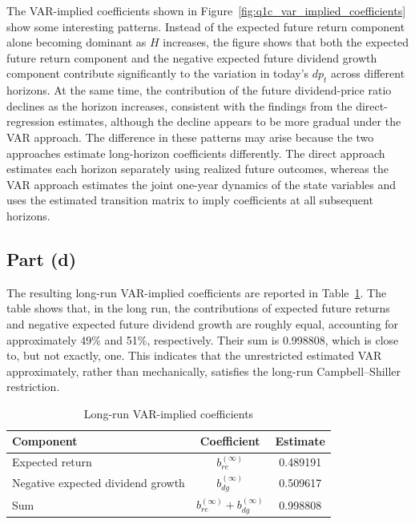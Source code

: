 \documentclass[11pt]{article}
\begin{document}
The VAR-implied coefficients shown in Figure~\ref{fig:q1c_var_implied_coefficients} show some interesting patterns. Instead of the expected future return component alone becoming dominant as $H$ increases, the figure shows that both the expected future return component and the negative expected future dividend growth component contribute significantly to the variation in today's $dp_t$ across different horizons. At the same time, the contribution of the future dividend-price ratio declines as the horizon increases, consistent with the findings from the direct-regression estimates, although the decline appears to be more gradual under the VAR approach.
The difference in these patterns may arise because the two approaches estimate long-horizon coefficients differently. The direct approach estimates each horizon separately using realized future outcomes, whereas the VAR approach estimates the joint one-year dynamics of the state variables and uses the estimated transition matrix to imply coefficients at all subsequent horizons.

\subsection{Part (d)}
The resulting long-run VAR-implied coefficients are reported in Table~\ref{tab:q1d_long_run}. The table shows that, in the long run, the contributions of expected future returns and negative expected future dividend growth are roughly equal, accounting for approximately 49\% and 51\%, respectively. Their sum is 0.998808, which is close to, but not exactly, one. This indicates that the unrestricted estimated VAR approximately, rather than mechanically, satisfies the long-run Campbell--Shiller restriction.
\begin{table}[htbp]
    \centering
    \caption{Long-run VAR-implied coefficients}
    \label{tab:q1d_long_run}
    \begin{tabular}{lcc}
        \toprule
        Component & Coefficient & Estimate \\
        \midrule
        Expected return & $b_{re}^{(\infty)}$ & 0.489191 \\
        Negative expected dividend growth & $b_{dg}^{(\infty)}$ & 0.509617 \\
        Sum & $b_{re}^{(\infty)}+b_{dg}^{(\infty)}$ & 0.998808 \\
        \bottomrule
    \end{tabular}
\end{table}
\FloatBarrier
\end{document}
